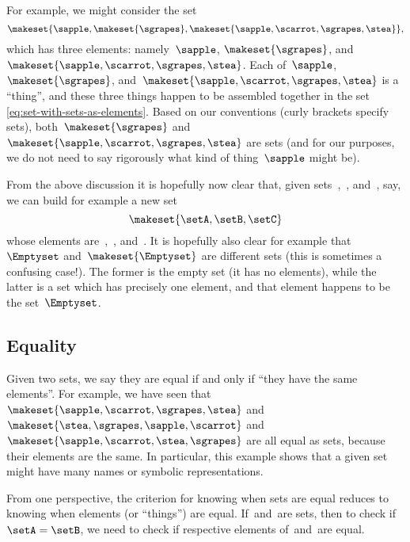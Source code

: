For example, we might consider the set
%
\begin{equation}
    \label{eq:set-with-sets-as-elements}
    \makeset{ \sapple, \makeset{ \sgrapes }, \makeset{ \sapple, \scarrot, \sgrapes, \stea } },
\end{equation}
%
which has three elements: namely~$\sapple$, $\makeset{ \sgrapes }$, and~$\makeset{ \sapple, \scarrot, \sgrapes, \stea }$.
Each of~$\sapple$, $\makeset{ \sgrapes }$, and~$\makeset{ \sapple, \scarrot, \sgrapes, \stea }$ is a ``thing'', and these three things happen to be assembled together in the set \cref{eq:set-with-sets-as-elements}.
Based on our conventions (curly brackets specify sets), both~$\makeset{ \sgrapes }$ and~$\makeset{ \sapple, \scarrot, \sgrapes, \stea }$ are sets (and for our purposes, we do not need to say rigorously what kind of thing~$\sapple$ might be).

From the above discussion it is hopefully now clear that, given sets~\setA,~\setB, and~\setC, say, we can build for example a new set
\begin{equation}
    \makeset{ \setA, \setB, \setC }
\end{equation}
whose elements are~\setA,~\setB, and~\setC.
It is hopefully also clear for example that~$\Emptyset$ and~$\makeset{ \Emptyset }$ are different sets (this is sometimes a confusing case!).
The former is the empty set (it has no elements), while the latter is a set which has precisely one element, and that element happens to be the set~$\Emptyset$.

\subsection{Equality}

Given two sets, we say they are equal if and only if ``they have the same elements''.
For example, we have seen that~$\makeset{\sapple, \scarrot, \sgrapes, \stea }$ and~$\makeset{ \stea, \sgrapes, \sapple, \scarrot}$ and~$\makeset{ \sapple, \scarrot, \stea, \sgrapes }$ are all equal as sets, because their elements are the same.
In particular, this example shows that a given set might have many names or symbolic representations.

From one perspective, the criterion for knowing when sets are equal reduces to knowing when elements (or ``things'') are equal.
If~\setA and~\setB are sets, then to check if~$\setA = \setB$, we need to check if respective elements of~\setA and~\setB are equal.


